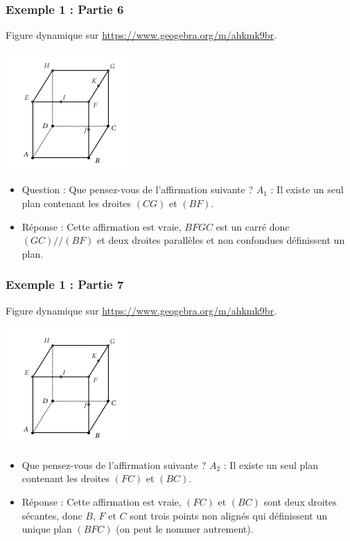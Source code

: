 \documentclass[xcolor=svgnames,t,final]{beamer}
\begin{document}
\begin{frame}

\frametitle{Exemple 1 : Partie 6}

Figure dynamique sur \href{https://www.geogebra.org/m/ahkmk9br}{https://www.geogebra.org/m/ahkmk9br}.


\begin{center}
\includegraphics[scale=0.4]{images/exemple1.png}
\end{center}

\begin{itemize}
\pause \item {\color{blue} Question : Que pensez-vous de l'affirmation suivante ?  $A_{1}$ : \og{} Il existe un seul plan contenant les droites  $(CG)$ et $(BF)$. \og{} \og{}}
\pause \item {\color{red} Réponse :  Cette affirmation est vraie,  $BFGC$ est un carré donc $(GC)//(BF)$ et deux droites parallèles et non confondues définissent un plan. 
}
\end{itemize}


\end{frame}




\begin{frame}

\frametitle{Exemple 1 : Partie 7}

Figure dynamique sur \href{https://www.geogebra.org/m/ahkmk9br}{https://www.geogebra.org/m/ahkmk9br}.


\begin{center}
\includegraphics[scale=0.4]{images/exemple1.png}
\end{center}

\begin{itemize}
\pause \item {\color{blue}  Que pensez-vous de l'affirmation suivante ? $A_{2}$ :  \og{} Il existe un seul plan contenant les droites  $(FC)$ et $(BC)$. \fg{}}
\pause \item {\color{red} Réponse :  Cette affirmation est vraie, $(FC)$ et $(BC)$ sont deux droites sécantes, donc $B$, $F$ et $C$ sont trois points non alignés qui définissent un unique plan $(BFC)$ (on peut le nommer autrement). 
}
\end{itemize}


\end{frame}
\end{document}
